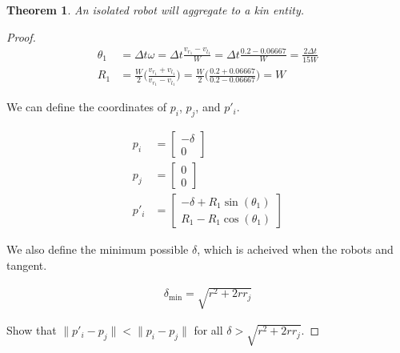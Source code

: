 \documentclass[conference]{IEEEtran}
\newtheorem{theorem}{Theorem}
\begin{document}
  \begin{theorem} \label{thm:aggregation_with_kin}
    An isolated robot will aggregate to a kin entity.
  \end{theorem}
  \begin{proof}
    \begin{align} \label{eq:kin_theta_and_r}
      \theta_1 &= \Delta t\omega = \Delta t \frac{v_{r_1} - v_{l_1}}{W} = \Delta t \frac{0.2 - 0.06667}{W} = \frac{2\Delta t}{15W} \\
      R_1 &= \frac{W}{2}\bigg(\frac{v_{r_1} + v_{l_1}}{v_{r_1} - v_{l_1}}\bigg) = \frac{W}{2}\bigg(\frac{0.2 + 0.06667}{0.2 - 0.06667}\bigg) = W
    \end{align}

    We can define the coordinates of $p_i$, $p_j$, and $p'_i$.

    \begin{align} \label{eq:kin_coordinates}
      p_i &= \begin{bmatrix}-\delta \\ 0\end{bmatrix} \\
      p_j &= \begin{bmatrix}0 \\ 0\end{bmatrix} \\
      p'_i &= \begin{bmatrix}-\delta+R_1\sin(\theta_1) \\ R_1-R_1\cos(\theta_1)\end{bmatrix}
    \end{align}

    We also define the minimum possible $\delta$, which is acheived when the robots and tangent.

    \begin{align} \label{eq:min_delta}
      \delta_{\text{min}} = \sqrt{r^2+2rr_j}
    \end{align}


    Show that $\lVert p'_i - p_j\rVert < \lVert p_i - p_j\rVert$ for all $\delta > \sqrt{r^2+2rr_j}$.


\end{proof}
\end{document}
